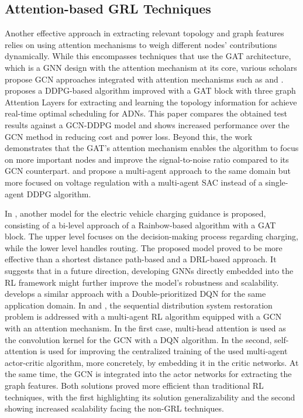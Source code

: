 \subsection{Attention-based GRL Techniques}
Another effective approach in extracting relevant topology and graph features relies on using attention mechanisms to weigh different nodes' contributions dynamically. While this encompasses techniques that use the \ac{GAT} architecture, which is a \ac{GNN} design with the attention mechanism at its core, various scholars propose \ac{GCN} approaches integrated with attention mechanisms such as \cite{zhaoLearningSequentialDistribution2022} and \cite{fanAttentionBasedMultiAgentGraph2023}.
\cite{xingRealtimeOptimalScheduling2023} proposes a \ac{DDPG}-based algorithm improved with a \ac{GAT} block with three graph Attention Layers for extracting and learning the topology information for achieve real-time optimal scheduling for \acp{ADN}. This paper compares the obtained test results against a \ac{GCN}-\ac{DDPG} model and shows increased performance over the \ac{GCN} method in reducing cost and power loss. Beyond this, the work demonstrates that the \ac{GAT}'s attention mechanism enables the algorithm to focus on more important nodes and improve the signal-to-noise ratio compared to its \ac{GCN} counterpart. \cite{chenPhysicalassistedMultiagentGraph2023} and propose a multi-agent approach to the same domain but more focused on voltage regulation with a multi-agent \ac{SAC} instead of a single-agent \ac{DDPG} algorithm. \par
In \cite{xingBilevelGraphReinforcement2023}, another model for the electric vehicle charging guidance is proposed, consisting of a bi-level approach of a Rainbow-based algorithm with a \ac{GAT} block. The upper level focuses on the decision-making process regarding charging, while the lower level handles routing. The proposed model proved to be more effective than a shortest distance path-based \cite{xingModellingDrivingCharging2021} and a \ac{DRL}-based \cite{qianDeepReinforcementLearning2020} approach. It suggests that in a future direction, developing \acp{GNN} directly embedded into the \ac{RL} framework might further improve the model's robustness and scalability. \cite{xuRealtimeFastCharging2022} develops a similar approach with a Double-prioritized DQN for the same application domain.
In \cite{zhaoLearningSequentialDistribution2022} and \cite{fanAttentionBasedMultiAgentGraph2023}, the sequential distribution system restoration problem is addressed with a multi-agent \ac{RL} algorithm equipped with a \ac{GCN} with an attention mechanism. In the first case, multi-head attention is used as the convolution kernel for the \ac{GCN} with a \ac{DQN} algorithm. In the second, self-attention is used for improving the centralized training of the used multi-agent actor-critic algorithm, more concretely, by embedding it in the critic networks. At the same time, the \ac{GCN} is integrated into the actor networks for extracting the graph features. Both solutions proved more efficient than traditional \ac{RL} techniques, with the first highlighting its solution generalizability and the second showing increased scalability facing the non-GRL techniques.


